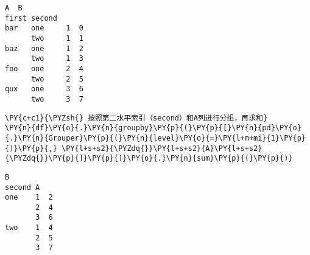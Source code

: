             \begin{tcolorbox}[breakable, size=fbox, boxrule=.5pt, pad at break*=1mm, opacityfill=0]
\begin{Verbatim}[commandchars=\\\{\}]
              A  B
first second
bar   one     1  0
      two     1  1
baz   one     1  2
      two     1  3
foo   one     2  4
      two     2  5
qux   one     3  6
      two     3  7
\end{Verbatim}
\end{tcolorbox}
        
    \begin{tcolorbox}[breakable, size=fbox, boxrule=1pt, pad at break*=1mm,colback=cellbackground, colframe=cellborder]
\begin{Verbatim}[commandchars=\\\{\}]
\PY{c+c1}{\PYZsh{} 按照第二水平索引（second）和A列进行分组，再求和}
\PY{n}{df}\PY{o}{.}\PY{n}{groupby}\PY{p}{(}\PY{p}{[}\PY{n}{pd}\PY{o}{.}\PY{n}{Grouper}\PY{p}{(}\PY{n}{level}\PY{o}{=}\PY{l+m+mi}{1}\PY{p}{)}\PY{p}{,} \PY{l+s+s2}{\PYZdq{}}\PY{l+s+s2}{A}\PY{l+s+s2}{\PYZdq{}}\PY{p}{]}\PY{p}{)}\PY{o}{.}\PY{n}{sum}\PY{p}{(}\PY{p}{)}
\end{Verbatim}
\end{tcolorbox}

            \begin{tcolorbox}[breakable, size=fbox, boxrule=.5pt, pad at break*=1mm, opacityfill=0]
\begin{Verbatim}[commandchars=\\\{\}]
          B
second A
one    1  2
       2  4
       3  6
two    1  4
       2  5
       3  7
\end{Verbatim}
\end{tcolorbox}
